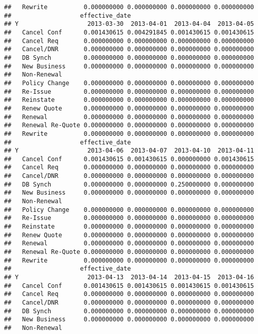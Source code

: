 \documentclass[]{article}
\begin{document}
\begin{verbatim}
##   Rewrite          0.000000000 0.000000000 0.000000000 0.000000000
##                   effective_date
## Y                   2013-03-30  2013-04-01  2013-04-04  2013-04-05
##   Cancel Conf      0.001430615 0.004291845 0.001430615 0.001430615
##   Cancel Req       0.000000000 0.000000000 0.000000000 0.000000000
##   Cancel/DNR       0.000000000 0.000000000 0.000000000 0.000000000
##   DB Synch         0.000000000 0.000000000 0.000000000 0.000000000
##   New Business     0.000000000 0.000000000 0.000000000 0.000000000
##   Non-Renewal                                                     
##   Policy Change    0.000000000 0.000000000 0.000000000 0.000000000
##   Re-Issue         0.000000000 0.000000000 0.000000000 0.000000000
##   Reinstate        0.000000000 0.000000000 0.000000000 0.000000000
##   Renew Quote      0.000000000 0.000000000 0.000000000 0.000000000
##   Renewal          0.000000000 0.000000000 0.000000000 0.000000000
##   Renewal Re-Quote 0.000000000 0.000000000 0.000000000 0.000000000
##   Rewrite          0.000000000 0.000000000 0.000000000 0.000000000
##                   effective_date
## Y                   2013-04-06  2013-04-07  2013-04-10  2013-04-11
##   Cancel Conf      0.001430615 0.001430615 0.000000000 0.001430615
##   Cancel Req       0.000000000 0.000000000 0.000000000 0.000000000
##   Cancel/DNR       0.000000000 0.000000000 0.000000000 0.000000000
##   DB Synch         0.000000000 0.000000000 0.250000000 0.000000000
##   New Business     0.000000000 0.000000000 0.000000000 0.000000000
##   Non-Renewal                                                     
##   Policy Change    0.000000000 0.000000000 0.000000000 0.000000000
##   Re-Issue         0.000000000 0.000000000 0.000000000 0.000000000
##   Reinstate        0.000000000 0.000000000 0.000000000 0.000000000
##   Renew Quote      0.000000000 0.000000000 0.000000000 0.000000000
##   Renewal          0.000000000 0.000000000 0.000000000 0.000000000
##   Renewal Re-Quote 0.000000000 0.000000000 0.000000000 0.000000000
##   Rewrite          0.000000000 0.000000000 0.000000000 0.000000000
##                   effective_date
## Y                   2013-04-13  2013-04-14  2013-04-15  2013-04-16
##   Cancel Conf      0.001430615 0.001430615 0.001430615 0.001430615
##   Cancel Req       0.000000000 0.000000000 0.000000000 0.000000000
##   Cancel/DNR       0.000000000 0.000000000 0.000000000 0.000000000
##   DB Synch         0.000000000 0.000000000 0.000000000 0.000000000
##   New Business     0.000000000 0.000000000 0.000000000 0.000000000
##   Non-Renewal                                                     

\end{verbatim}
\end{document}
